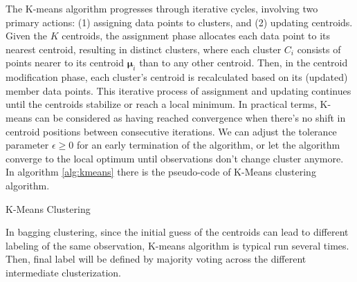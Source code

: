 The K-means algorithm progresses through iterative cycles, involving two primary actions: (1) assigning data points to clusters, and (2) updating centroids. Given the $K$ centroids, the assignment phase allocates each data point to its nearest centroid, resulting in distinct clusters, where each cluster $C_i$ consists of points nearer to its centroid $\bm{\mu}_i$ than to any other centroid. Then, in the centroid modification phase, each cluster's centroid is recalculated based on its (updated) member data points. This iterative process of assignment and updating continues until the centroids stabilize or reach a local minimum. In practical terms, K-means can be considered as having reached convergence when there's no shift in centroid positions between consecutive iterations. We can adjust the tolerance parameter $\epsilon \geq 0$ for an early termination of the algorithm, or let the algorithm converge to the local optimum until observations don't change cluster anymore. In algorithm \ref{alg:kmeans} there is the pseudo-code of K-Means clustering algorithm.
\begin{algorithm}[H]
\small
    \caption{K-Means Clustering}
    \label{alg:kmeans}
    \begin{algorithmic}[1]
    \REPEAT
    \ENDFOR
    \ENDFOR
    \end{algorithmic}
\end{algorithm} 
In bagging clustering, since the initial guess of the centroids can lead to different labeling of the same observation, K-means algorithm is typical run several times. Then, final label will be defined by majority voting across the different intermediate clusterization.

